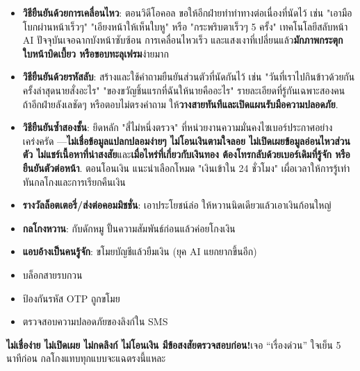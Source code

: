 \begin{itemize}
  \item \textbf{วิธียืนยันด้วยการเคลื่อนไหว}: ตอนวิดีโอคอล ขอให้อีกฝ่ายทำท่าทางต่อเนื่องที่นัดไว้ เช่น "เอามือโบกผ่านหน้าเร็วๆ" "เอียงหน้าให้เห็นใบหู" หรือ "กระพริบตาเร็วๆ 5 ครั้ง" เทคโนโลยีสลับหน้า AI ปัจจุบันเจอฉากบังหน้าซับซ้อน การเคลื่อนไหวเร็ว และแสงเงาที่เปลี่ยนแล้ว\textbf{มักภาพกระตุก ใบหน้าบิดเบี้ยว หรือขอบทะลุเฟรม}ง่ายมาก
  \item \textbf{วิธียืนยันด้วยรหัสลับ}: สร้างและใช้คำถามยืนยันส่วนตัวที่นัดกันไว้ เช่น "วันที่เราไปกินข้าวด้วยกันครั้งล่าสุดนายสั่งอะไร" "ของขวัญชิ้นแรกที่ฉันให้นายคืออะไร" รายละเอียดที่รู้กันเฉพาะสองคน ถ้าอีกฝ่ายลังเลชัดๆ หรือตอบไม่ตรงคำถาม ให้\textbf{วางสายทันทีและเปิดแผนรับมือความปลอดภัย}.
  \item \textbf{วิธียืนยันซ้ำสองชั้น}: ยึดหลัก "สี่ไม่หนึ่งตรวจ" ที่หน่วยงานความมั่นคงไซเบอร์ประกาศอย่างเคร่งครัด —\textbf{ไม่เชื่อข้อมูลแปลกปลอมง่ายๆ ไม่โอนเงินตามใจลอย ไม่เปิดเผยข้อมูลอ่อนไหวส่วนตัว ไม่แชร์เนื้อหาที่น่าสงสัย}และ\textbf{เมื่อไหร่ที่เกี่ยวกับเงินทอง ต้องโทรกลับด้วยเบอร์เดิมที่รู้จัก หรือยืนยันตัวต่อหน้า}. ตอนโอนเงิน แนะนำเลือกโหมด "เงินเข้าใน 24 ชั่วโมง" เผื่อเวลาให้การรู้เท่าทันกลโกงและการเรียกคืนเงิน
\end{itemize}


\begin{itemize}
  \item \textbf{รางวัลล็อตเตอรี่/ส่งต่อคอมมิชชั่น}: เอาประโยชน์ล่อ ให้หวานนิดเดียวแล้วเอาเงินก้อนใหญ่
  \item \textbf{กลโกงหวาน}: กับดักหมู ปั้นความสัมพันธ์ก่อนแล้วค่อยโกงเงิน
  \item \textbf{แอบอ้างเป็นคนรู้จัก}: ขโมยบัญชีแล้วยืมเงิน (ยุค AI แยกยากขึ้นอีก)
\end{itemize}


\begin{itemize}
  \item บล็อกสายรบกวน
  \item ป้องกันรหัส OTP ถูกขโมย
  \item ตรวจสอบความปลอดภัยของลิงก์ใน SMS
\end{itemize}


\textbf{ไม่เชื่อง่าย ไม่เปิดเผย ไม่กดลิงก์ ไม่โอนเงิน มีข้อสงสัยตรวจสอบก่อน!}เจอ “เรื่องด่วน” ใจเย็น 5 นาทีก่อน กลโกงแทบทุกแบบจะแฉตรงนี้แหละ

